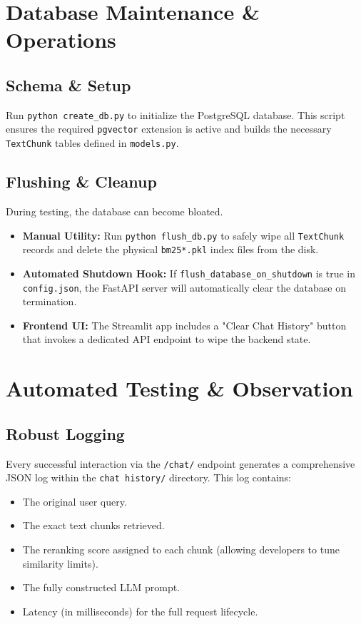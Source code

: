 \documentclass[11pt, a4paper]{article}
\begin{document}
\section{Database Maintenance \& Operations}

\subsection{Schema \& Setup}
Run \texttt{python create\_db.py} to initialize the PostgreSQL database. This script ensures the required \texttt{pgvector} extension is active and builds the necessary \texttt{TextChunk} tables defined in \texttt{models.py}.

\subsection{Flushing \& Cleanup}
During testing, the database can become bloated.
\begin{itemize}
    \item \textbf{Manual Utility:} Run \texttt{python flush\_db.py} to safely wipe all \texttt{TextChunk} records and delete the physical \texttt{bm25*.pkl} index files from the disk.
    \item \textbf{Automated Shutdown Hook:} If \texttt{flush\_database\_on\_shutdown} is true in \texttt{config.json}, the FastAPI server will automatically clear the database on termination.
    \item \textbf{Frontend UI:} The Streamlit app includes a "Clear Chat History" button that invokes a dedicated API endpoint to wipe the backend state.
\end{itemize}

\section{Automated Testing \& Observation}

\subsection{Robust Logging}
Every successful interaction via the \texttt{/chat/} endpoint generates a comprehensive JSON log within the \texttt{chat history/} directory. 
This log contains:
\begin{itemize}
    \item The original user query.
    \item The exact text chunks retrieved.
    \item The reranking score assigned to each chunk (allowing developers to tune similarity limits).
    \item The fully constructed LLM prompt.
    \item Latency (in milliseconds) for the full request lifecycle.
\end{itemize}
\end{document}

